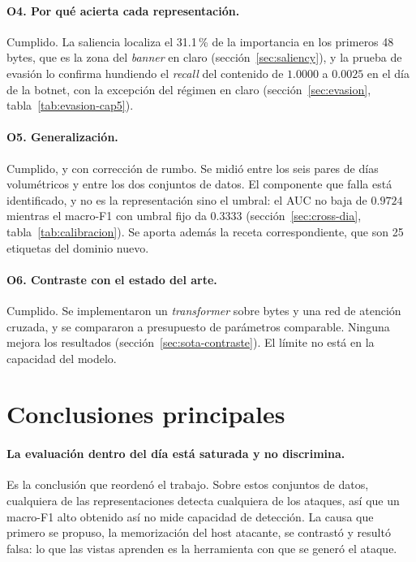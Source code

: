 \paragraph{O4. Por qué acierta cada representación.} Cumplido. La saliencia
localiza el 31.1\,\% de la importancia en los primeros 48 bytes, que es la zona
del \emph{banner} en claro (sección~\ref{sec:saliency}), y la prueba de evasión
lo confirma hundiendo el \emph{recall} del contenido de $1.0000$ a $0.0025$
en el día de la botnet, con la excepción del régimen en claro
(sección~\ref{sec:evasion}, tabla~\ref{tab:evasion-cap5}).

\paragraph{O5. Generalización.} Cumplido, y con corrección de rumbo. Se midió
entre los seis pares de días volumétricos y entre los dos conjuntos de datos. El
componente que falla está identificado, y no es la representación sino el
umbral: el AUC no baja de $0.9724$ mientras el macro-F1 con umbral fijo da
$0.3333$ (sección~\ref{sec:cross-dia}, tabla~\ref{tab:calibracion}). Se aporta
además la receta correspondiente, que son 25 etiquetas del dominio nuevo.

\paragraph{O6. Contraste con el estado del arte.} Cumplido. Se implementaron un
\emph{transformer} sobre bytes y una red de atención cruzada, y se compararon a
presupuesto de parámetros comparable. Ninguna mejora los resultados
(sección~\ref{sec:sota-contraste}). El límite no está en la capacidad del
modelo.

\section{Conclusiones principales}
\label{sec:conclusiones-principales}

\paragraph{La evaluación dentro del día está saturada y no discrimina.} Es la
conclusión que reordenó el trabajo. Sobre estos conjuntos de datos, cualquiera
de las representaciones detecta cualquiera de los ataques, así que un
macro-F1 alto obtenido así no mide capacidad de detección. La causa que primero
se propuso, la memorización del host atacante, se contrastó y resultó falsa: lo
que las vistas aprenden es la herramienta con que se generó el ataque.

